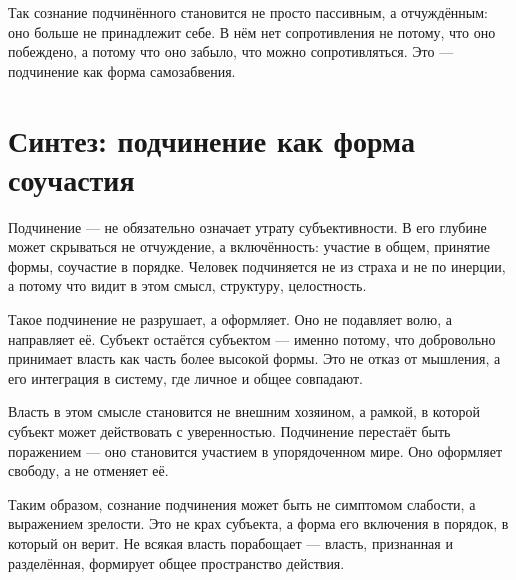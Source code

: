 Так сознание подчинённого становится не просто пассивным, а отчуждённым: оно больше не принадлежит себе. В нём нет сопротивления не потому, что оно побеждено, а потому что оно забыло, что можно сопротивляться. Это — подчинение как форма самозабвения.

\section{Синтез: подчинение как форма соучастия}

Подчинение — не обязательно означает утрату субъективности. В его глубине может скрываться не отчуждение, а включённость: участие в общем, принятие формы, соучастие в порядке. Человек подчиняется не из страха и не по инерции, а потому что видит в этом смысл, структуру, целостность.

Такое подчинение не разрушает, а оформляет. Оно не подавляет волю, а направляет её. Субъект остаётся субъектом — именно потому, что добровольно принимает власть как часть более высокой формы. Это не отказ от мышления, а его интеграция в систему, где личное и общее совпадают.

Власть в этом смысле становится не внешним хозяином, а рамкой, в которой субъект может действовать с уверенностью. Подчинение перестаёт быть поражением — оно становится участием в упорядоченном мире. Оно оформляет свободу, а не отменяет её.

Таким образом, сознание подчинения может быть не симптомом слабости, а выражением зрелости. Это не крах субъекта, а форма его включения в порядок, в который он верит. Не всякая власть порабощает — власть, признанная и разделённая, формирует общее пространство действия.
